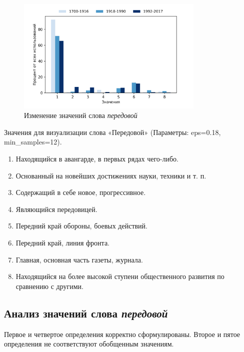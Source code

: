 \begin{figure}[H]
	\centering
	\includegraphics[width=0.8\textwidth]{img/visualizations/peredovoj_minimal}
	\caption{Изменение значений слова \textit{передовой}}
	\label{fig:Передовой}
\end{figure}

Значения для визуализации слова «Передовой» (Параметры: eps=0.18, min\_samples=12).

\begin{enumerate}
    \item Находящийся в авангарде, в первых рядах чего-либо.
    \item Основанный на новейших достижениях науки, техники и т. п.
    \item Содержащий в себе новое, прогрессивное.
    \item Являющийся передовицей.
    \item Передний край обороны, боевых действий.
    \item Передний край, линия фронта.
    \item Главная, основная часть газеты, журнала.
    \item Находящийся на более высокой ступени общественного развития по сравнению с другими.
\end{enumerate}

\subsection*{Анализ значений слова \textit{передовой}}

Первое и четвертое определения корректно сформулированы.
Второе и пятое определения не соответствуют обобщенным значениям.

